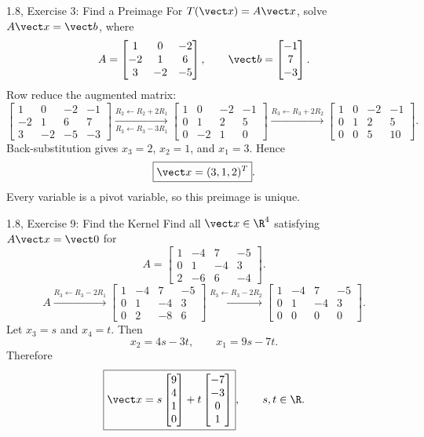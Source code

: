 \begin{frame}{1.8, Exercise 3: Find a Preimage}
\footnotesize
For $T(\vect x)=A\vect x$, solve $A\vect x=\vect b$, where
\[
A=\begin{bmatrix}1&0&-2\\-2&1&6\\3&-2&-5\end{bmatrix},
\qquad
\vect b=\begin{bmatrix}-1\\7\\-3\end{bmatrix}.
\]
Row reduce the augmented matrix:
\[
\left[\begin{array}{ccc|c}
1&0&-2&-1\\-2&1&6&7\\3&-2&-5&-3
\end{array}\right]
\xrightarrow[R_3\leftarrow R_3-3R_1]{R_2\leftarrow R_2+2R_1}
\left[\begin{array}{ccc|c}
1&0&-2&-1\\0&1&2&5\\0&-2&1&0
\end{array}\right]
\xrightarrow{R_3\leftarrow R_3+2R_2}
\left[\begin{array}{ccc|c}
1&0&-2&-1\\0&1&2&5\\0&0&5&10
\end{array}\right].
\]
\pause
Back-substitution gives
$x_3=2$, $x_2=1$, and $x_1=3$.
Hence
\[
\boxed{\vect x=(3,1,2)^T}.
\]
Every variable is a pivot variable, so this preimage is unique.
\end{frame}

\begin{frame}{1.8, Exercise 9: Find the Kernel}
\footnotesize
Find all $\vect x\in\R^4$ satisfying $A\vect x=\vect0$ for
\[
A=\begin{bmatrix}1&-4&7&-5\\0&1&-4&3\\2&-6&6&-4\end{bmatrix}.
\]
\[
A\xrightarrow{R_3\leftarrow R_3-2R_1}
\begin{bmatrix}1&-4&7&-5\\0&1&-4&3\\0&2&-8&6\end{bmatrix}
\xrightarrow{R_3\leftarrow R_3-2R_2}
\begin{bmatrix}1&-4&7&-5\\0&1&-4&3\\0&0&0&0\end{bmatrix}.
\]
\pause
Let $x_3=s$ and $x_4=t$. Then
\[
x_2=4s-3t,
\qquad
x_1=9s-7t.
\]
Therefore
\[
\boxed{\vect x
=s\begin{bmatrix}9\\4\\1\\0\end{bmatrix}
+t\begin{bmatrix}-7\\-3\\0\\1\end{bmatrix}},
\qquad s,t\in\R.
\]
\end{frame}

